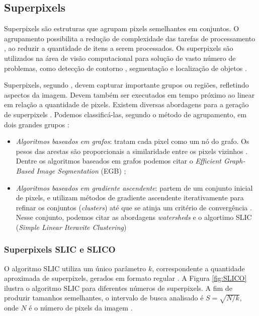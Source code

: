 \begin{document}
\subsection{Superpixels} \label{ssec:super}

Superpixels são estruturas que agrupam pixels semelhantes em conjuntos. O agrupamento possibilita a redução de complexidade das tarefas de processamento \cite{SLIC}, ao reduzir a quantidade de itens a serem processados. Os superpixels são utilizados na área de visão computacional para solução de vasto número de problemas, como detecção de contorno \cite{CONTOUR}, segmentação \cite{SEG_MERGE} e localização de objetos \cite{SEG_LOCALIZ}.

Superpixels, segundo \cite{FELZENSZWALB}, devem capturar importante grupos ou regiões, refletindo aspectos da imagem. Devem também ser executados em tempo próximo ao linear em relação a quantidade de pixels. Existem diversas abordagens para a geração de superpixels \cite{SLIC}. Podemos classificá-las, segundo o método de agrupamento, em dois grandes grupos \cite{SLIC}: 

\begin{itemize}
 \item \textit{Algoritmos baseados em grafos}: tratam cada pixel como um nó do grafo. Os pesos das arestas são proporcionais a similaridade entre os pixels vizinhos \cite{SLIC}. Dentre os algoritmos baseados em grafos podemos citar o \textit{Efficient Graph-Based Image Segmentation} (EGB) \cite{FELZENSZWALB};
 \item \textit{Algoritmos baseados em gradiente ascendente}: partem de um conjunto inicial de pixels, e utilizam métodos de gradiente ascendente iterativamente para refinar os conjuntos (\textit{clusters}) até que se atinja um critério de convergência \cite{SLIC}. Nesse conjunto, podemos  citar as abordagens \textit{watersheds} \cite{WATERSHEDS} e o algortimo SLIC (\textit{Simple Linear Iteravite Clustering}) \cite{SLIC}
\end{itemize}


\subsubsection{Superpixels SLIC e SLICO} \label{sssec:slic}

O algoritmo SLIC utiliza um único parâmetro $k$, correspondente a quantidade aproximada de superpixels, gerados em formato regular \cite{SLIC}. A Figura \ref{fig:SLICO} ilustra o algoritmo SLIC para diferentes números de superpixels. A fim de produzir tamanhos semelhantes, o intervalo de busca analisado é \mbox{$S=\sqrt{N/k}$}, onde $N$ é o número de pixels da imagem \cite{SLIC}. 
\end{document}

